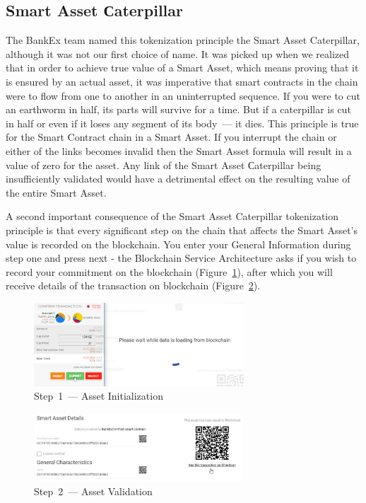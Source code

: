 \documentclass{article}
\begin{document}
\begin{multicols}{2}
\subsection{Smart Asset Сaterpillar}

The BankEx team named this tokenization principle the Smart Asset Caterpillar, although it was not our first choice of name. It was picked up when we realized that in order to achieve true value of a Smart Asset, which means proving that it is ensured by an actual asset, it was imperative that smart contracts in the chain were to flow from one to another in an uninterrupted sequence. If you were to cut an earthworm in half, its parts will survive for a time. But if a caterpillar is cut in half or even if it loses any segment of its body~--- it dies. This principle is true for the Smart Contract chain in a Smart Asset. If you interrupt the chain or either of the links becomes invalid then the Smart Asset formula will result in a value of zero for the asset. Any link of the Smart Asset Сaterpillar being insufficiently validated would have a detrimental effect on the resulting value of the entire Smart Asset. 

A second important consequence of the Smart Asset Caterpillar tokenization principle is that every significant step on the chain that affects the Smart Asset’s value is recorded on the blockchain. You enter your General Information during step one and press next - the Blockchain Service Architecture asks if you wish to record your commitment on the blockchain (Figure~\ref{fig:asset-creation}), after which you will receive details of the transaction on blockchain (Figure~\ref{fig:asset-detail}).

\begin{figure}
  \centering
  \includegraphics[width=0.7\textwidth]{asset-creation.png}
  \caption{Step~1~--- Asset Initialization}
  \label{fig:asset-creation}
\end{figure}

\begin{figure}
  \centering
  \includegraphics[width=0.7\textwidth]{asset-detail}
  \caption{Step~2~--- Asset Validation}
  \label{fig:asset-detail}
\end{figure}


\end{multicols}
\end{document}
